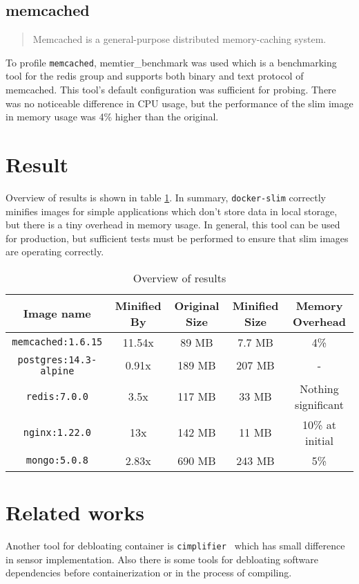 \documentclass[10pt]{article}
\begin{document}
\subsection{memcached}
\begin{quote}
    Memcached is a general-purpose distributed memory-caching system.
\end{quote}
To profile {\tt memcached}, memtier\_benchmark was used which is a benchmarking tool for the redis group and supports both binary and text protocol of memcached. This tool's default configuration was sufficient for probing. There was no noticeable difference in CPU usage, but the performance of the slim image in memory usage was 4\% higher than the original.


\section{Result}
Overview of results is shown in table \ref{result-overview}. In summary, {\tt docker-slim} correctly minifies images for simple applications which don't store data in local storage, but there is a tiny overhead in memory usage. In general, this tool can be used for production, but sufficient tests must be performed to ensure that slim images are operating correctly.
\begin{table}[h]
\caption{Overview of results}
\label{result-overview}
    \begin{center}
        \begin{tabular}{|c|c|c|c|c|}
            \hline
            Image name & Minified By & Original Size & Minified Size & Memory Overhead \\
            \hline
            {\tt memcached:1.6.15} & 11.54x & 89 MB & 7.7 MB & 4\% \\
            \hline
            {\tt postgres:14.3-alpine} & 0.91x & 189 MB & 207 MB & - \\
            \hline
            {\tt redis:7.0.0} & 3.5x & 117 MB & 33 MB & Nothing significant \\
            \hline
            {\tt nginx:1.22.0} & 13x & 142 MB & 11 MB & 10\% at initial \\
            \hline
            {\tt mongo:5.0.8} & 2.83x & 690 MB & 243 MB & 5\% \\
            \hline
        \end{tabular}
    \end{center}
\end{table}

\section{Related works}
Another tool for debloating container is {\tt cimplifier } which has small difference in sensor implementation.\citep{Rastogi_2017} Also there is some tools for debloating software dependencies before containerization or in the process of compiling. \citep{Bruce_2020}



\end{document}
